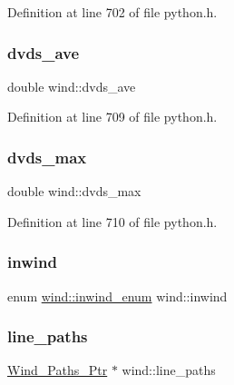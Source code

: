 Definition at line 702 of file python.\+h.

\mbox{\label{structwind_a4d9c9c37e5ea6f91b06918e723217fed}} 
\subsubsection{\texorpdfstring{dvds\+\_\+ave}{dvds\_ave}}
{\footnotesize\ttfamily double wind\+::dvds\+\_\+ave}



Definition at line 709 of file python.\+h.

\mbox{\label{structwind_aa03474c00bb0ac035bd883ef18c4edac}} 
\subsubsection{\texorpdfstring{dvds\+\_\+max}{dvds\_max}}
{\footnotesize\ttfamily double wind\+::dvds\+\_\+max}



Definition at line 710 of file python.\+h.

\mbox{\label{structwind_a7f4f2ec3bc9cea1d4dec351b026b9a73}} 
\subsubsection{\texorpdfstring{inwind}{inwind}}
{\footnotesize\ttfamily enum \hyperlink{structwind_a0cb1b3175908a106ae86ce77d5d2a8a4}{wind\+::inwind\+\_\+enum}  wind\+::inwind}

\mbox{\label{structwind_a131a30d1943ba6394b7d74328d9374b7}} 
\subsubsection{\texorpdfstring{line\+\_\+paths}{line\_paths}}
{\footnotesize\ttfamily \hyperlink{python_8h_af5cbc81f9fbd8ac7596e3a989073df45}{Wind\+\_\+\+Paths\+\_\+\+Ptr} $\ast$ wind\+::line\+\_\+paths}



